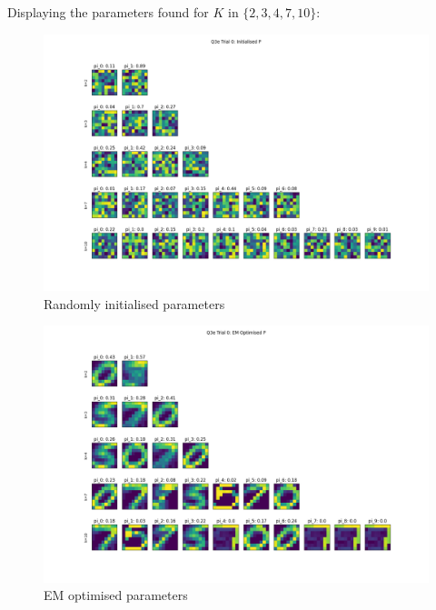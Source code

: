 \documentclass[12pt]{article}
\begin{document}
\begin{enumerate}
{Displaying the parameters found for $K$ in $\{2, 3, 4, 7, 10\}$:
\begin{figure}[h]
  \centering
  \includegraphics[scale=0.3]{outputs/q3/q3e-0-initialised-p}
  \caption{Randomly initialised parameters}
  \label{fig:3d-initialised-p}
\end{figure}
\begin{figure}[h]
  \centering
  \includegraphics[scale=0.3]{outputs/q3/q3e-0-optimised-p}
  \caption{EM optimised parameters}
  \label{fig:3d-optimised-p}
\end{figure}



}
\end{enumerate}
\end{document}
